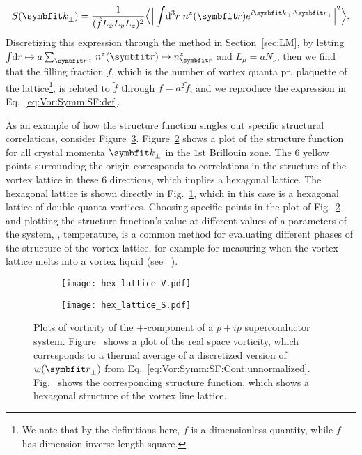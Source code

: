 \begin{equation}
    \label{eq:Vor:Symm:SF:Cont:structureFunction}
    S(\v{k}_\perp) = \frac{1}{(\tilde{f}L_xL_yL_z)^2}\Big\langle\Big|\int\!\mathrm{d}^3r\;n^z(\v{r})e^{i\v{k}_\perp\cdot\v{r}_\perp}\Big|^2\Big\rangle.
\end{equation}
Discretizing this expression through the method in Section~\ref{sec:LM}, \ie by letting $\int\!\mathrm{d}r\mapsto a\sum_\v{r}$, $n^z(\v{r})\mapsto n^z_\v{r}$ and $L_\mu = aN_\nu$, then
we find that the filling fraction $f$, which is the number of vortex quanta pr. plaquette of the lattice\footnote{We note that by the definitions here, $f$ is a dimensionless quantity, while $\tilde{f}$ has dimension inverse length square.}, is related to $\tilde{f}$ through $f = a^2\tilde{f}$, and we reproduce the expression in
Eq.~\eqref{eq:Vor:Symm:SF:def}.

As an example of how the structure function singles out specific structural correlations, consider Figure~\ref{fig:Vor:Symm:SF:hex}. Figure~\ref{fig:Vor:Symm:SF:hex:S} shows a plot of the structure
function for all crystal momenta $\v{k}_\perp$ in the $1$st Brillouin zone. The $6$ yellow points surrounding the origin corresponds to correlations in the structure of the vortex lattice in these
$6$ directions, which implies a hexagonal lattice. The hexagonal lattice is shown directly in Fig.~\ref{fig:Vor:Symm:SF:hex:V}, which in this case is a hexagonal lattice of double-quanta vortices.
Choosing specific points in the plot of Fig.~\ref{fig:Vor:Symm:SF:hex:S} and plotting the structure function's value at different values of a parameters of the system, \eg, temperature, is a common
method for evaluating different phases of the structure of the vortex lattice, for example for measuring when the vortex lattice melts into a vortex liquid (see \eg\
\cite{Smorgrav05,Smiseth05,NguyenPhase98,Nguyen96,NguyenOnsager98}).

\begin{figure}[h]
    \newcommand{\fractionwidth}{.45}
    \centering
    \begin{subfigure}[b]{\fractionwidth\textwidth}
        \centering
        \texttt{[image: hex\_lattice\_V.pdf]}
        \caption{\label{fig:Vor:Symm:SF:hex:V}}
    \end{subfigure}
    \hspace{2em}
    \begin{subfigure}[b]{\fractionwidth\textwidth}
        \centering
        \texttt{[image: hex\_lattice\_S.pdf]}
        \caption{\label{fig:Vor:Symm:SF:hex:S}}
    \end{subfigure}
    \caption{Plots of vorticity of the $+$-component of a $p+ip$ superconductor system. Figure~\protect{} shows a plot of the real space vorticity, which corresponds to a thermal average of a discretized version of $w(\v{r}_\perp)$ from Eq.~\eqref{eq:Vor:Symm:SF:Cont:unnormalized}. Fig.~\protect{} shows the corresponding structure function, which shows a hexagonal structure of the vortex line lattice.}
    \label{fig:Vor:Symm:SF:hex}
\end{figure}

